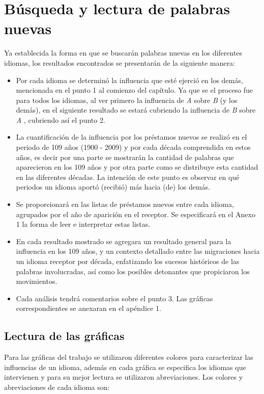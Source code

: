 \section{Búsqueda y lectura de palabras nuevas} %
Ya establecida la forma en que se buscarán  palabras nuevas en los diferentes
idiomas,  los resultados encontrados se presentarán de la siguiente manera:
\begin{itemize}
\item Por cada idioma se determinó la influencia que esté ejerció en los demás,
mencionada en el punto 1 al comienzo del capítulo.   Ya que se el proceso fue
para todos los idiomas,  al ver primero la influencia de \textit{A} sobre
\textit{B}  (y los demás),  en el siguiente resultado se estará cubriendo la
influencia  de \textit{B}  sobre \textit{A} , cubriendo así el punto 2. 
\item La cuantificación de la influencia por los préstamos nuevos se realizó en
el periodo de 109 años (1900 - 2009) y por cada década comprendida en estos
años, es decir por una parte se mostrarán la cantidad de palabras que
aparecieron en los 109 años y por otra parte como se distribuye esta cantidad
en las diferentes décadas.  La intención de este punto es observar en qué
periodos un idioma aportó (recibió) más  hacia (de) los demás.
\item Se proporcionará en \cite{prestamos_nuevos} las listas  de préstamos
nuevos entre cada idioma, agrupados por el año de aparición en el receptor.  Se
especificará en el Anexo 1  la forma de leer e interpretar estas listas.
\item En cada resultado mostrado se agregara un resultado general para la
influencia en los 109 años, y un contexto detallado entre las migraciones hacia
un idioma receptor por década,  enfatizando los sucesos históricos de las
palabras involucradas, así como los posibles detonantes que propiciaron los
movimientos. 
\item Cada análisis tendrá comentarios sobre el punto 3. Las gráficas
correspondientes se anexaran en el apéndice 1.
\end{itemize}
\subsection*{Lectura de las gráficas} %

Para las gráficas del trabajo se utilizaron diferentes colores para
caracterizar las influencias de un idioma, además en cada gráfica se especifica
los idiomas que intervienen y para su mejor lectura se utilizaron
abreviaciones. Los colores y abreviaciones de cada idioma son:

